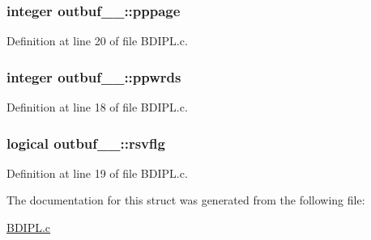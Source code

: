 \subsubsection[{\texorpdfstring{pppage}{pppage}}]{\setlength{\rightskip}{0pt plus 5cm}integer outbuf\+\_\+\_\+\+::pppage}\hypertarget{structoutbuf__1___a27eb4a4bc2ef810478115969649a48e9}{}\label{structoutbuf__1___a27eb4a4bc2ef810478115969649a48e9}


Definition at line 20 of file B\+D\+I\+P\+L.\+c.

\subsubsection[{\texorpdfstring{ppwrds}{ppwrds}}]{\setlength{\rightskip}{0pt plus 5cm}integer outbuf\+\_\+\_\+\+::ppwrds}\hypertarget{structoutbuf__1___ab7b0bc9f0f51da45931598759d2c5038}{}\label{structoutbuf__1___ab7b0bc9f0f51da45931598759d2c5038}


Definition at line 18 of file B\+D\+I\+P\+L.\+c.

\subsubsection[{\texorpdfstring{rsvflg}{rsvflg}}]{\setlength{\rightskip}{0pt plus 5cm}logical outbuf\+\_\+\_\+\+::rsvflg}\hypertarget{structoutbuf__1___a2274669ab85a2ca71435cfa276df333b}{}\label{structoutbuf__1___a2274669ab85a2ca71435cfa276df333b}


Definition at line 19 of file B\+D\+I\+P\+L.\+c.



The documentation for this struct was generated from the following file\+:\begin{DoxyCompactItemize}
\item 
\hyperlink{BDIPL_8c}{B\+D\+I\+P\+L.\+c}\end{DoxyCompactItemize}
